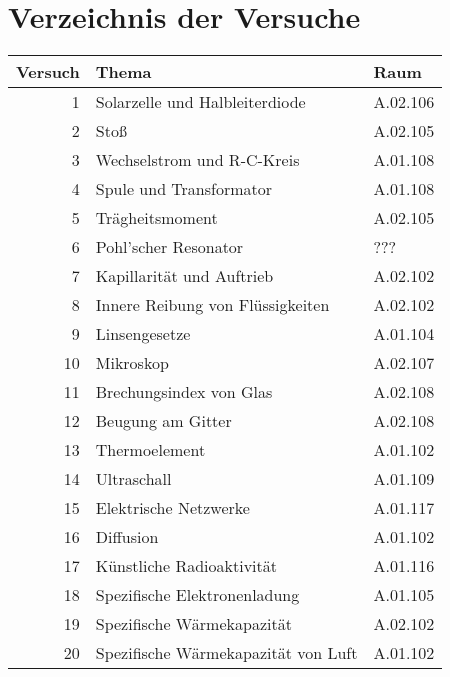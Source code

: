 
\chapter{Verzeichnis der Versuche}

\begin{table}[h!]
 \centering
 \begin{tabular}{rll}
 \hline
 Versuch & Thema & Raum\\
 \hline
 1 & Solarzelle und Halbleiterdiode & A.02.106\\ 
 2 & Stoß & A.02.105\\
 3 & Wechselstrom und R-C-Kreis & A.01.108 \\ 
 4 & Spule und Transformator & A.01.108 \\ 
 5 & Trägheitsmoment & A.02.105\\ 
 6 & Pohl'scher Resonator & ??? \\
 7 & Kapillarität und Auftrieb & A.02.102 \\ 
 8 & Innere Reibung von Flüssigkeiten & A.02.102 \\ 
 9 & Linsengesetze & A.01.104 \\ 
 10 & Mikroskop & A.02.107 \\ 
 11 & Brechungsindex von Glas & A.02.108 \\ 
 12 & Beugung am Gitter & A.02.108\\ 
 13 & Thermoelement & A.01.102 \\ 
 14 & Ultraschall & A.01.109\\
 15 & Elektrische Netzwerke & A.01.117 \\ 
 16 & Diffusion & A.01.102\\ 
 17 & Künstliche Radioaktivität & A.01.116 \\ 
 18 & Spezifische Elektronenladung & A.01.105 \\ 
 19 & Spezifische Wärmekapazität & A.02.102 \\ 
 20 & Spezifische Wärmekapazität von Luft & A.01.102 \\ 
 \hline
 \end{tabular}
\end{table}
  